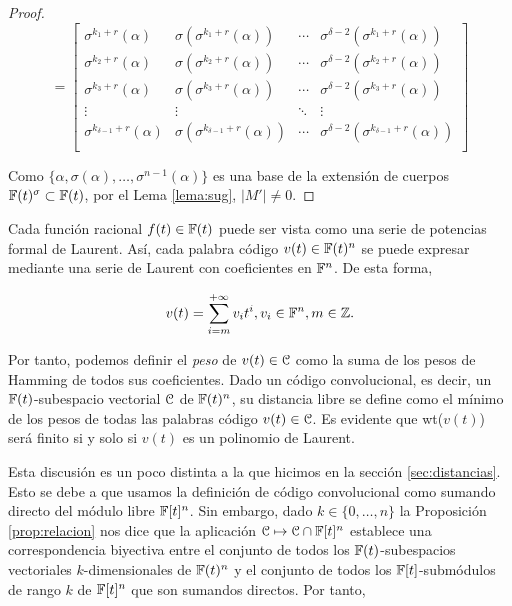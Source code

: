\begin{proof}
\[ = 
\begin{bmatrix}
\sigma^{k_1 + r}(\alpha) & \sigma(\sigma^{k_1 + r}(\alpha)) & \cdots & \sigma^{\delta - 2}(\sigma^{k_1 + r}(\alpha)) \\
\sigma^{k_2 + r}(\alpha) & \sigma(\sigma^{k_2 + r}(\alpha)) & \cdots & \sigma^{\delta - 2}(\sigma^{k_2 + r}(\alpha)) \\
\sigma^{k_3 + r}(\alpha) & \sigma(\sigma^{k_3 + r}(\alpha)) & \cdots & \sigma^{\delta - 2}(\sigma^{k_3 + r}(\alpha)) \\
\vdots & \vdots & \ddots & \vdots \\
\sigma^{k_{\delta - 1} + r}(\alpha) & \sigma(\sigma^{k_{\delta - 1} + r}(\alpha)) & \cdots & \sigma^{\delta - 2}(\sigma^{k_{\delta - 1} + r}(\alpha)) \\
\end{bmatrix} 
\] 

Como $\{\alpha,\sigma(\alpha),\dots,\sigma^{n-1}(\alpha)\}$ es una base de la extensión de cuerpos $\mathbb{F}(t)^\sigma \subset \mathbb{F}(t)$, por el Lema \ref{lema:sug}, $|M'| \neq 0$.
\end{proof}

Cada función racional $f(t) \in \mathbb{F}(t)$ puede ser vista como una serie de potencias formal de Laurent. Así, cada palabra código $v(t) \in \mathbb{F}(t)^n$ se puede expresar mediante una serie de Laurent con coeficientes en $\mathbb{F}^n$. De esta forma,

$$v(t) = \sum_{i=m}^{+\infty}v_it^i, v_i \in \mathbb{F}^n, m \in \mathbb{Z}.$$

Por tanto, podemos definir el \emph{peso} de $v(t) \in \mathcal C$ como la suma de los pesos de Hamming de todos sus coeficientes. Dado un código convolucional, es decir, un $\mathbb{F}(t)$-subespacio vectorial $\mathcal C$ de $\mathbb{F}(t)^n$, su distancia libre se define como el mínimo de los pesos de todas las palabras código $v(t) \in \mathcal C$. Es evidente que wt($v(t)$) será finito si y solo si $v(t)$ es un polinomio de Laurent.

Esta discusión es un poco distinta a la que hicimos en la sección \ref{sec:distancias}. Esto se debe a que usamos la definición de código convolucional como sumando directo del módulo libre $\mathbb{F}[t]^n$. Sin embargo, dado $k \in \{0,\dots,n\}$ la Proposición \ref{prop:relacion} nos dice que la aplicación $\mathcal C \mapsto \mathcal C \cap \mathbb{F}[t]^n$ establece una correspondencia biyectiva entre el conjunto de todos los $\mathbb{F}(t)$-subespacios vectoriales $k$-dimensionales de $\mathbb{F}(t)^n$ y el conjunto de todos los $\mathbb{F}[t]$-submódulos de rango $k$ de $\mathbb{F}[t]^n$ que son sumandos directos. Por tanto,

